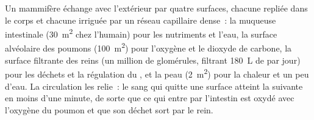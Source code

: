 \begin{proposition}\label{prop:b1:mammal-organization:surfaces}
Un mammifère échange avec l'extérieur par quatre surfaces, chacune
repliée dans le corps et chacune irriguée par un réseau capillaire
dense~: la muqueuse intestinale (\qty{30}{m^2} chez l'humain) pour les
nutriments et l'eau, la surface alvéolaire des poumons
(\qty{100}{m^2}) pour l'oxygène et le dioxyde de carbone, la surface
filtrante des reins (un million de glomérules, filtrant \qty{180}{L} de
 par jour) pour les déchets et la régulation du ,
et la peau (\qty{2}{m^2}) pour la chaleur et un peu d'eau. La
circulation les relie~: le sang qui quitte une surface atteint la
suivante en moins d'une minute, de sorte que ce qui entre par
l'intestin est oxydé avec l'oxygène du poumon et que son déchet sort par
le rein.
\end{proposition}

